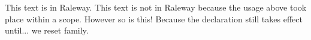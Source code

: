 \documentclass{article}
\begin{document}
{\ralewayfont This text is in Raleway.}
This text is not in Raleway because the usage above took place within a scope.
However so is this! Because the declaration still takes effect until...
\rmfamily we reset family.
\end{document}
